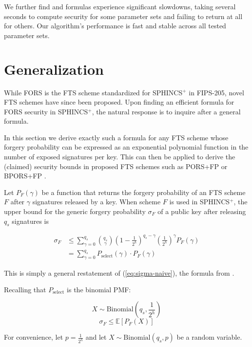 \documentclass[11pt]{article}
\newcommand{\spx}{SPHINCS$^+$\xspace}
\begin{document}
We further find \cite{sphincsplus} and \cite{smaller_sphincs} formulas experience significant slowdowns, taking several seconds to compute security for some parameter sets and failing to return at all for others. Our algorithm's performance is fast and stable across all tested parameter sets.

\section{Generalization}

While FORS is the FTS scheme standardized for \spx in FIPS-205, novel FTS schemes have since been proposed. Upon finding an efficient formula for FORS security in \spx, the natural response is to inquire after a general formula.

In this section we derive exactly such a formula for any FTS scheme whose forgery probability can be expressed as an exponential polynomial function in the number of exposed signatures per key. This can then be applied to derive the (claimed) security bounds in proposed FTS schemes such as PORS+FP \cite{forced_pruning} or BPORS+FP \cite{bucket_thinning}.

Let $P_F(\gamma)$ be a function that returns the forgery probability of an FTS scheme $F$ after $\gamma$ signatures released by a key. When scheme $F$ is used in \spx, the upper bound for the generic forgery probability $\sigma_F$ of a public key after releasing $q_s$ signatures is

\begin{align}
  \sigma_F
    &\le \sum_{\gamma=0}^{q_s} \binom{q_s}{\gamma} \left( 1 - \frac{1}{2^h} \right)^{q_s - \gamma} \left( \frac{1}{2^h} \right)^\gamma P_F(\gamma) \\
    &= \sum_{\gamma=0}^{q_s} P_\text{select}(\gamma) \cdot P_F(\gamma)
\end{align}

This is simply a general restatement of (\ref{eq:sigma-naive}), the formula from \cite{sphincsplus}.

Recalling that $P_\text{select}$ is the binomial PMF:

\begin{equation}
  X \sim \mathrm{Binomial} \left( q_s, \frac{1}{2^h} \right)
\end{equation}
\begin{equation}
  \sigma_F \le \mathbb E \left[ P_F(X) \right]
\end{equation}

For convenience, let $p = \frac{1}{2^h}$ and let $X \sim \mathrm{Binomial} \left( q_s, p \right)$ be a random variable.
\end{document}
